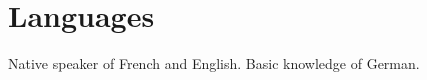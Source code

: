 \documentclass[a4paper,10pt]{article}
\begin{document}
\section{Languages}
Native speaker of French and English. Basic knowledge of German.
%
%
%
\end{document}

